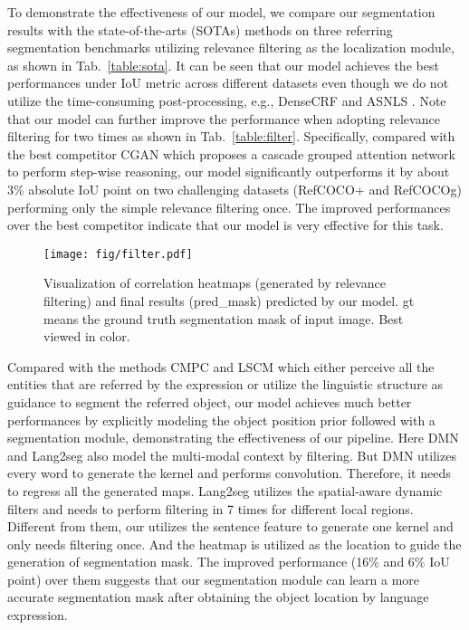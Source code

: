 To demonstrate the effectiveness of our model, we compare our segmentation results with the state-of-the-arts (SOTAs) methods on three referring segmentation benchmarks utilizing relevance filtering as the localization module, as shown in Tab.~\ref{table:sota}. It can be seen that our model achieves the best performances under IoU metric across different datasets even though we do not utilize the time-consuming post-processing, e.g., DenseCRF \cite{krahenbuhl2011efficient} and ASNLS \cite{luo2020multi}. Note that our model can further improve the performance when adopting relevance filtering for two times as shown in Tab.~\ref{table:filter}. Specifically, compared with the best competitor CGAN \cite{luo2020cascade} which proposes a cascade grouped attention network to perform step-wise reasoning, our model significantly outperforms it by about 3\% absolute IoU point on two challenging datasets (RefCOCO+ and RefCOCOg) performing only the simple relevance filtering once. The improved performances over the best competitor indicate that our model is very effective for this task.

\begin{figure*}[t]
\centering
\texttt{[image: fig/filter.pdf]}
\caption{Visualization of correlation heatmaps  (generated by relevance filtering) and final results  (pred\_mask) predicted by our model. gt means the ground truth segmentation mask of input image. Best viewed in color.}
\label{fig:filter}
\end{figure*}

Compared with the methods CMPC \cite{huang2020referring} and LSCM \cite{huilinguistic} which either perceive all the entities that are referred by the expression or utilize the linguistic structure as guidance to segment the referred object, our model achieves much better performances by explicitly
modeling the object position prior followed with a segmentation module, demonstrating the effectiveness of our pipeline. Here DMN \cite{margffoy2018dynamic} and Lang2seg \cite{chen2019referring} also model the multi-modal context by filtering.
But DMN utilizes every word to generate the kernel and performs convolution. Therefore, it needs to regress all the generated maps. Lang2seg utilizes the spatial-aware dynamic filters and needs to perform filtering in 7 times for different local regions. Different from them, our \method utilizes the sentence feature to generate one kernel and only needs filtering once. And the heatmap is utilized as the location to guide the generation of segmentation mask. 
The improved performance (16\% and 6\% IoU point) over them suggests that our segmentation module can learn a more accurate segmentation mask after obtaining the object location by language expression. 










